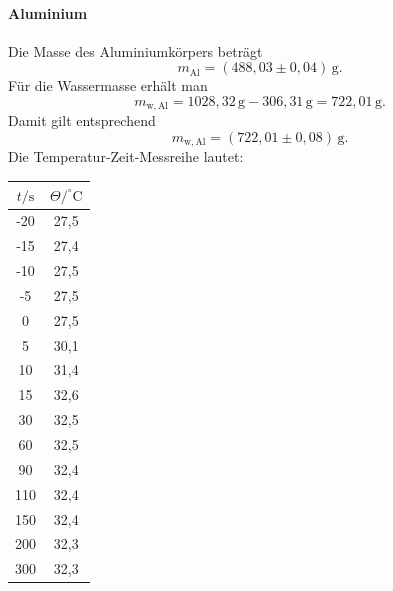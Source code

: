 \documentclass{report}
\begin{document}
\paragraph{Aluminium}
\noindent
Die Masse des Aluminiumkörpers beträgt
\[
m_\mathrm{Al}=(488{,}03\pm0{,}04)\,\mathrm{g}.
\]
\noindent
Für die Wassermasse erhält man
\[
m_{\mathrm{w,Al}}
=
1028{,}32\,\mathrm{g}-306{,}31\,\mathrm{g}
=
722{,}01\,\mathrm{g}.
\]
\noindent
Damit gilt entsprechend
\[
m_{\mathrm{w,Al}}=(722{,}01\pm0{,}08)\,\mathrm{g}.
\]
\noindent
Die Temperatur-Zeit-Messreihe lautet:

\begin{center}
\begin{tabular}{c|c}
$t/\mathrm{s}$ & $\Theta/^\circ\mathrm{C}$\\
\hline
-20 & 27,5\\
-15 & 27,4\\
-10 & 27,5\\
-5  & 27,5\\
0   & 27,5\\
5   & 30,1\\
10  & 31,4\\
15  & 32,6\\
30  & 32,5\\
60  & 32,5\\
90  & 32,4\\
110 & 32,4\\
150 & 32,4\\
200 & 32,3\\
300 & 32,3
\end{tabular}
\end{center}
\end{document}

